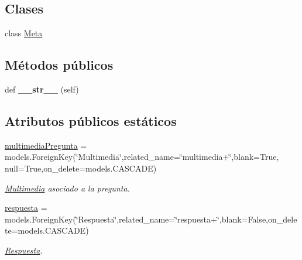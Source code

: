 \subsection*{Clases}
\begin{DoxyCompactItemize}
\item 
class \hyperlink{classappEmotionIOT_1_1models_1_1Pregunta__Matching_1_1Meta}{Meta}
\end{DoxyCompactItemize}
\subsection*{Métodos públicos}
\begin{DoxyCompactItemize}
\item 
def {\bfseries \+\_\+\+\_\+str\+\_\+\+\_\+} (self)\hypertarget{classappEmotionIOT_1_1models_1_1Pregunta__Matching_a3a4c050c5397882e6b31df78f76291f8}{}\label{classappEmotionIOT_1_1models_1_1Pregunta__Matching_a3a4c050c5397882e6b31df78f76291f8}

\end{DoxyCompactItemize}
\subsection*{Atributos públicos estáticos}
\begin{DoxyCompactItemize}
\item 
\hyperlink{classappEmotionIOT_1_1models_1_1Pregunta__Matching_af130b7c2682482b7fe054579734f7b03}{multimedia\+Pregunta} = models.\+Foreign\+Key(\char`\"{}Multimedia\char`\"{},related\+\_\+name=\char`\"{}multimedia+\char`\"{},blank=True, null=True,on\+\_\+delete=models.\+C\+A\+S\+C\+A\+DE)\hypertarget{classappEmotionIOT_1_1models_1_1Pregunta__Matching_af130b7c2682482b7fe054579734f7b03}{}\label{classappEmotionIOT_1_1models_1_1Pregunta__Matching_af130b7c2682482b7fe054579734f7b03}

\begin{DoxyCompactList}\small\item\em \hyperlink{classappEmotionIOT_1_1models_1_1Multimedia}{Multimedia} asociado a la pregunta. \end{DoxyCompactList}\item 
\hyperlink{classappEmotionIOT_1_1models_1_1Pregunta__Matching_a26c2dc89dd156d21c14c79c676e5094e}{respuesta} = models.\+Foreign\+Key(\char`\"{}Respuesta\char`\"{},related\+\_\+name=\char`\"{}respuesta+\char`\"{},blank=False,on\+\_\+delete=models.\+C\+A\+S\+C\+A\+DE)\hypertarget{classappEmotionIOT_1_1models_1_1Pregunta__Matching_a26c2dc89dd156d21c14c79c676e5094e}{}\label{classappEmotionIOT_1_1models_1_1Pregunta__Matching_a26c2dc89dd156d21c14c79c676e5094e}

\begin{DoxyCompactList}\small\item\em \hyperlink{classappEmotionIOT_1_1models_1_1Respuesta}{Respuesta}. \end{DoxyCompactList}\end{DoxyCompactItemize}


